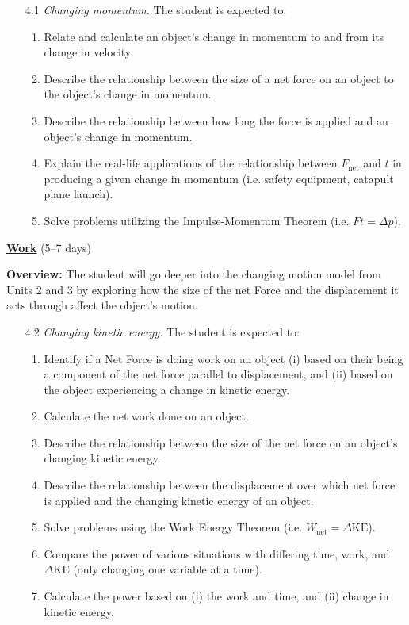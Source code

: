 \documentclass[dvipsnames]{article}
\begin{document}
\begin{enumerate}[topsep=0pt]
    \item[4.1] \textit{Changing momentum.} The student is expected to:
    \begin{enumerate}[itemsep=0pt,topsep=0pt]
        \item Relate and calculate an object's change in momentum to and from its change in velocity.
        \item Describe the relationship between the size of a net force on an object to the object's change in momentum.
        \item Describe the relationship between how long the force is applied and an object's change in momentum.
        \item Explain the real-life applications of the relationship between $F_\mathrm{net}$ and $t$ in producing a given change in momentum (i.e. safety equipment, catapult plane launch).
        \item Solve problems utilizing the Impulse-Momentum Theorem (i.e. $F t = \Delta p$).
    \end{enumerate}
\end{enumerate}

\textbf{\underline{Work}} (5--7 days)

\textbf{Overview:} The student will go deeper into the changing motion model from Units 2 and 3 by exploring how the size of the net Force and the displacement it acts through affect the object's motion.

\begin{enumerate}[topsep=0pt]
    \item[4.2] \textit{Changing kinetic energy.} The student is expected to:
    \begin{enumerate}[topsep=0pt,itemsep=0pt]
        \item Identify if a Net Force is doing work on an object (i) based on their being a component of the net force parallel to displacement, and (ii) based on the object experiencing a change in kinetic energy.
        \item Calculate the net work done on an object.
        \item Describe the relationship between the size of the net force on an object's changing kinetic energy.
        \item Describe the relationship between the displacement over which net force is applied and the changing kinetic energy of an object.
        \item Solve problems using the Work Energy Theorem (i.e. $W_\mathrm{net} = \Delta \mathrm{KE}$).
        \item Compare the power of various situations with differing time, work, and $\Delta \mathrm{KE}$ (only changing one variable at a time).
        \item Calculate the power based on (i) the work and time, and (ii) change in kinetic energy.
    \end{enumerate}
\end{enumerate}
\end{document}
